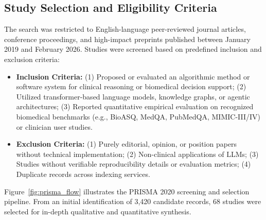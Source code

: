 \documentclass[12pt,a4paper]{report}
\begin{document}
\subsection{Study Selection and Eligibility Criteria}
The search was restricted to English-language peer-reviewed journal articles, conference proceedings, and high-impact preprints published between January 2019 and February 2026. Studies were screened based on predefined inclusion and exclusion criteria:
\begin{itemize}
    \item \textbf{Inclusion Criteria:} (1) Proposed or evaluated an algorithmic method or software system for clinical reasoning or biomedical decision support; (2) Utilized transformer-based language models, knowledge graphs, or agentic architectures; (3) Reported quantitative empirical evaluation on recognized biomedical benchmarks (e.g., BioASQ, MedQA, PubMedQA, MIMIC-III/IV) or clinician user studies.
    \item \textbf{Exclusion Criteria:} (1) Purely editorial, opinion, or position papers without technical implementation; (2) Non-clinical applications of LLMs; (3) Studies without verifiable reproducibility details or evaluation metrics; (4) Duplicate records across indexing services.
\end{itemize}

Figure~\ref{fig:prisma_flow} illustrates the PRISMA 2020 screening and selection pipeline. From an initial identification of 3,420 candidate records, 68 studies were selected for in-depth qualitative and quantitative synthesis.
\end{document}
